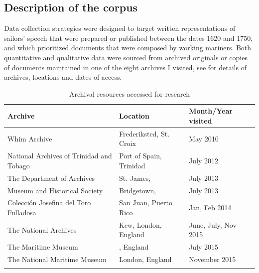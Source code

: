 \subsection{{Description of the corpus}}\label{sec:1.3.2}



Data collection strategies were designed to target written representations of sailors’ speech that were prepared or published between the dates 1620 and 1750, and which prioritized documents that were composed by working mariners. Both quantitative and qualitative data were sourced from archived originals or copies of documents maintained in one of the eight archives I visited, see  for details of archives, locations and dates of access.


\begin{table}\begin{tabularx}{\textwidth}{Qll}
\lsptoprule

\textbf{Archive} & \textbf{Location} & \textbf{Month/Year} \textbf{visited}\\
\midrule 
Whim Archive & Frederiksted, St. Croix &  {May 2010}\\
\tablevspace
National Archives of Trinidad and Tobago & Port of Spain, Trinidad &  {July 2012}\\
\tablevspace
The  Department of Archives & St. James,  &  {July 2013}\\
\tablevspace
{} Museum and Historical Society & Bridgetown,  &  {July 2013}\\
\tablevspace
Colección Josefina del Toro Fulladosa & San Juan, Puerto Rico & Jan,  {Feb 2014}\\
\tablevspace
The National Archives & Kew, London, England & June, July,  {Nov 2015}\\
\tablevspace
The  Maritime Museum & , England &  {July 2015}\\
\tablevspace
The National Maritime Museum & London, England &  {November 2015}\\
\lspbottomrule
\end{tabularx}

\caption{\label{tab:key:1.1} Archival resources accessed for research}
\end{table}



